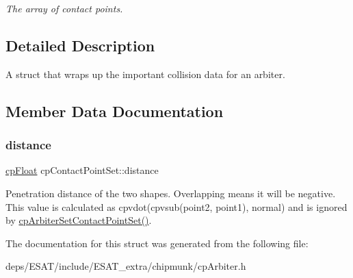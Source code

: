 \begin{DoxyCompactItemize}
\begin{tabbing}
\end{tabbing}\begin{DoxyCompactList}\small\item\em The array of contact points. \end{DoxyCompactList}\end{DoxyCompactItemize}


\subsection{Detailed Description}
A struct that wraps up the important collision data for an arbiter. 

\subsection{Member Data Documentation}
\mbox{\label{structcp_contact_point_set_ad8581bff488e9f44ef899f75e044bc6c}} 
\subsubsection{\texorpdfstring{distance}{distance}}
{\footnotesize\ttfamily \mbox{\hyperlink{group__basic_types_gac1ed65573e035bf892505768c852d8d3}{cp\+Float}} cp\+Contact\+Point\+Set\+::distance}

Penetration distance of the two shapes. Overlapping means it will be negative. This value is calculated as cpvdot(cpvsub(point2, point1), normal) and is ignored by \mbox{\hyperlink{group__cp_arbiter_ga2a68f589f58dbae29de18cebee3de02d}{cp\+Arbiter\+Set\+Contact\+Point\+Set()}}. 

The documentation for this struct was generated from the following file\+:\begin{DoxyCompactItemize}
\item 
deps/\+E\+S\+A\+T/include/\+E\+S\+A\+T\+\_\+extra/chipmunk/cp\+Arbiter.\+h\end{DoxyCompactItemize}
